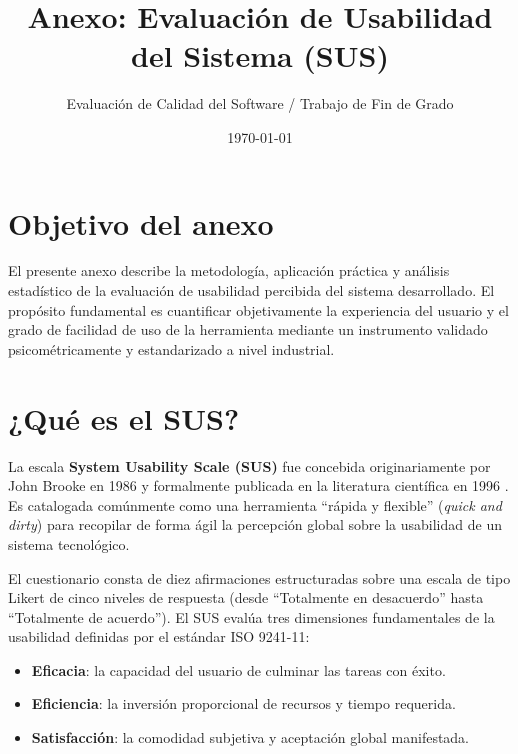 \documentclass[11pt,a4paper]{article}
\title{\textbf{Anexo: Evaluación de Usabilidad del Sistema (SUS)}}
\author{Evaluación de Calidad del Software / Trabajo de Fin de Grado}
\date{\today}
\begin{document}
\maketitle


\section{Objetivo del anexo}
El presente anexo describe la metodología, aplicación práctica y análisis estadístico de la evaluación de usabilidad percibida del sistema desarrollado. El propósito fundamental es cuantificar objetivamente la experiencia del usuario y el grado de facilidad de uso de la herramienta mediante un instrumento validado psicométricamente y estandarizado a nivel industrial.

\section{¿Qué es el SUS?}
La escala \textbf{System Usability Scale (SUS)} fue concebida originariamente por John Brooke en 1986 y formalmente publicada en la literatura científica en 1996 \parencite{Brooke1996}. Es catalogada comúnmente como una herramienta \enquote{rápida y flexible} (\textit{quick and dirty}) para recopilar de forma ágil la percepción global sobre la usabilidad de un sistema tecnológico.

El cuestionario consta de diez afirmaciones estructuradas sobre una escala de tipo Likert \parencite{Likert1932} de cinco niveles de respuesta (desde \enquote{Totalmente en desacuerdo} hasta \enquote{Totalmente de acuerdo}). El SUS evalúa tres dimensiones fundamentales de la usabilidad definidas por el estándar ISO 9241-11:
\begin{itemize}
    \item \textbf{Eficacia}: la capacidad del usuario de culminar las tareas con éxito.
    \item \textbf{Eficiencia}: la inversión proporcional de recursos y tiempo requerida.
    \item \textbf{Satisfacción}: la comodidad subjetiva y aceptación global manifestada.
\end{itemize}
\end{document}
